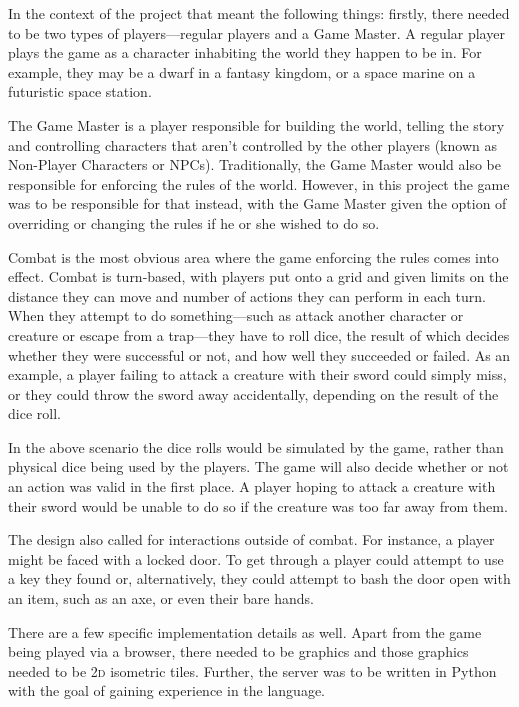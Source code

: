 In the context of the project that meant the following things: firstly, there needed to be two types of players---regular players and a Game Master. A regular player plays the game as a character inhabiting the world they happen to be in. For example, they may be a dwarf in a fantasy kingdom, or a space marine on a futuristic space station.

The Game Master is a player responsible for building the world, telling the story and controlling characters that aren't controlled by the other players (known as Non-Player Characters or NPCs). Traditionally, the Game Master would also be responsible for enforcing the rules of the world. However, in this project the game was to be responsible for that instead, with the Game Master given the option of overriding or changing the rules if he or she wished to do so.

Combat is the most obvious area where the game enforcing the rules comes into effect. Combat is turn-based, with players put onto a grid and given limits on the distance they can move and number of actions they can perform in each turn. When they attempt to do something---such as attack another character or creature or escape from a trap---they have to roll dice, the result of which decides whether they were successful or not, and how well they succeeded or failed. As an example, a player failing to attack a creature with their sword could simply miss, or they could throw the sword away accidentally, depending on the result of the dice roll.

In the above scenario the dice rolls would be simulated by the game, rather than physical dice being used by the players. The game will also decide whether or not an action was valid in the first place. A player hoping to attack a creature with their sword would be unable to do so if the creature was too far away from them.

The design also called for interactions outside of combat. For instance, a player might be faced with a locked door. To get through a player could attempt to use a key they found or, alternatively, they could attempt to bash the door open with an item, such as an axe, or even their bare hands.

There are a few specific implementation details as well. Apart from the game being played via a browser, there needed to be graphics and those graphics needed to be \textsc{2d} isometric tiles. Further, the server was to be written in Python with the goal of gaining experience in the language.

